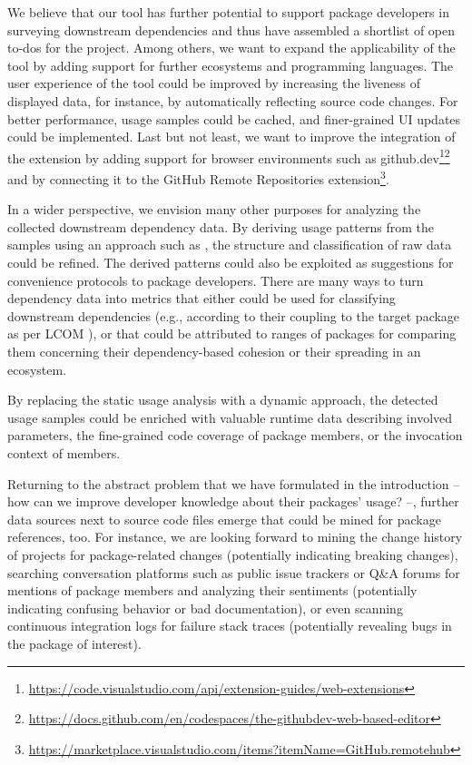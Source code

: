 We believe that our tool has further potential to support package developers in surveying downstream dependencies and thus have assembled a shortlist of open to-dos for the project.
Among others, we want to expand the applicability of the tool by adding support for further ecosystems and programming languages.
The user experience of the tool could be improved by increasing the liveness of displayed data, for instance, by automatically reflecting source code changes.
For better performance, usage samples could be cached, and finer-grained UI updates could be implemented.
Last but not least, we want to improve the integration of the extension by adding support for browser environments such as github.dev\footnote{\url{https://code.visualstudio.com/api/extension-guides/web-extensions}}\footnoteseparator\footnote{\url{https://docs.github.com/en/codespaces/the-githubdev-web-based-editor}} and by connecting it to the GitHub Remote Repositories extension\footnote{\url{https://marketplace.visualstudio.com/items?itemName=GitHub.remotehub}}.

In a wider perspective, we envision many other purposes for analyzing the collected downstream dependency data.
By deriving usage patterns from the samples using an approach such as \cite{zhong2009mapo}, the structure and classification of raw data could be refined.
The derived patterns could also be exploited as suggestions for convenience protocols to package developers.
There are many ways to turn dependency data into metrics that either could be used for classifying downstream dependencies (e.g., according to their coupling to the target package as per LCOM \citep{chidamber1994metrics}), or that could be attributed to ranges of packages for comparing them concerning their dependency-based cohesion or their spreading in an ecosystem.

By replacing the static usage analysis with a dynamic approach, the detected usage samples could be enriched with valuable runtime data describing involved parameters, the fine-grained code coverage of package members, or the invocation context of members.

Returning to the abstract problem that we have formulated in the introduction -- how can we improve developer knowledge about their packages' usage? --, further data sources next to source code files emerge that could be mined for package references, too.
For instance, we are looking forward to mining the change history of projects for package-related changes (potentially indicating breaking changes), searching conversation platforms such as public issue trackers or Q\&A forums for mentions of package members and analyzing their sentiments (potentially indicating confusing behavior or bad documentation), or even scanning continuous integration logs for failure stack traces (potentially revealing bugs in the package of interest).
